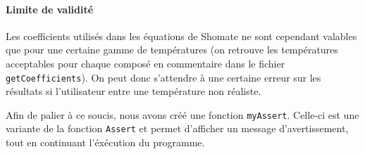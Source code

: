 \documentclass[a4paper,oneside,11pt]{article}
\newcommand{\fun}[1]{\texttt{#1}}
\begin{document}
\paragraph{Limite de validité}
Les coefficients utilisés dans les équations de Shomate ne sont 
cependant valables que pour une certaine gamme de températures 
(on retrouve les températures acceptables pour chaque composé 
en commentaire dans le fichier \fun{getCoefficients}). 
On peut donc s'attendre à une certaine erreur sur les résultats 
si l'utilisateur entre une température non réaliste. 

Afin de palier à ce soucis, nous avons créé une fonction \fun{myAssert}. 
Celle-ci est une variante de la fonction \fun{Assert} 
et permet d'afficher un message d'avertissement, 
tout en continuant l'éxécution du programme.
\end{document}
